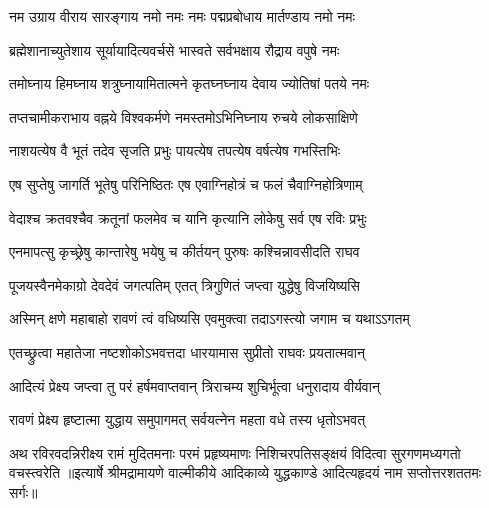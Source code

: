 \twolineshloka
{नम उग्राय वीराय सारङ्गाय नमो नमः}
{नमः पद्मप्रबोधाय मार्तण्डाय नमो नमः}

\twolineshloka
{ब्रह्मेशानाच्युतेशाय सूर्यायादित्यवर्चसे}
{भास्वते सर्वभक्षाय रौद्राय वपुषे नमः}

\twolineshloka
{तमोघ्नाय हिमघ्नाय शत्रुघ्नायामितात्मने}
{कृतघ्नघ्नाय देवाय ज्योतिषां पतये नमः}

\twolineshloka
{तप्तचामीकराभाय वह्नये विश्वकर्मणे}
{नमस्तमोऽभिनिघ्नाय रुचये लोकसाक्षिणे}

\twolineshloka
{नाशयत्येष वै भूतं तदेव सृजति प्रभुः}
{पायत्येष तपत्येष वर्षत्येष गभस्तिभिः}

\twolineshloka
{एष सुप्तेषु जागर्ति भूतेषु परिनिष्ठितः}
{एष एवाग्निहोत्रं च फलं चैवाग्निहोत्रिणाम्}

\twolineshloka
{वेदाश्च क्रतवश्चैव क्रतूनां फलमेव च}
{यानि कृत्यानि लोकेषु सर्व एष रविः प्रभुः}

\twolineshloka
{एनमापत्सु कृच्छ्रेषु कान्तारेषु भयेषु च}
{कीर्तयन् पुरुषः कश्चिन्नावसीदति राघव}

\twolineshloka
{पूजयस्वैनमेकाग्रो देवदेवं जगत्पतिम्}
{एतत् त्रिगुणितं जप्त्वा युद्धेषु विजयिष्यसि}

\twolineshloka
{अस्मिन् क्षणे महाबाहो रावणं त्वं वधिष्यसि}
{एवमुक्त्वा तदाऽगस्त्यो जगाम च यथाऽऽगतम्}

\twolineshloka
{एतच्छ्रुत्वा महातेजा नष्टशोकोऽभवत्तदा}
{धारयामास सुप्रीतो राघवः प्रयतात्मवान्}

\twolineshloka
{आदित्यं प्रेक्ष्य जप्त्वा तु परं हर्षमवाप्तवान्}
{त्रिराचम्य शुचिर्भूत्वा धनुरादाय वीर्यवान्}

\twolineshloka
{रावणं प्रेक्ष्य हृष्टात्मा युद्धाय समुपागमत्}
{सर्वयत्नेन महता वधे तस्य धृतोऽभवत्}

\fourlineindentedshloka
{अथ रविरवदन्निरीक्ष्य रामं}
{मुदितमनाः परमं प्रहृष्यमाणः}
{निशिचरपतिसङ्क्षयं विदित्वा}
{सुरगणमध्यगतो वचस्त्वरेति}
॥इत्यार्षे श्रीमद्रामायणे वाल्मीकीये आदिकाव्ये युद्धकाण्डे आदित्यहृदयं नाम सप्तोत्तरशततमः सर्गः॥